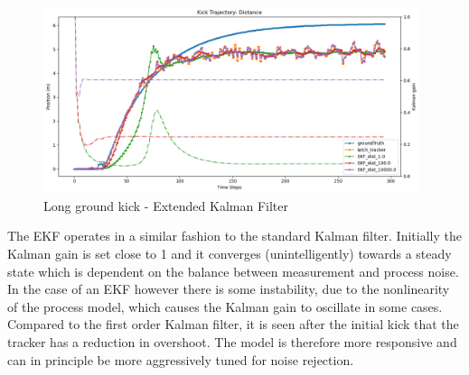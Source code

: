\documentclass[a4paper,twoside,12pt]{report}
\begin{document}
\begin{figure}[h!]
\begin{center}
\includegraphics[width=11cm]{images/ekf_ground_long.png}
\caption{Long ground kick - Extended Kalman Filter}
\label{fig:ekfgroundlong}
\end{center}
\end{figure}



The EKF operates in a similar fashion to the standard Kalman filter. Initially the Kalman gain is set close to 1 and it converges (unintelligently) towards a steady state which is dependent on the balance between measurement and process noise. In the case of an EKF however there is some instability, due to the nonlinearity of the process model, which causes the Kalman gain to oscillate in some cases. Compared to the first order Kalman filter, it is seen after the initial kick that the tracker has a reduction in overshoot. The model is therefore more responsive and can in principle be more aggressively tuned for noise rejection.
\end{document}
